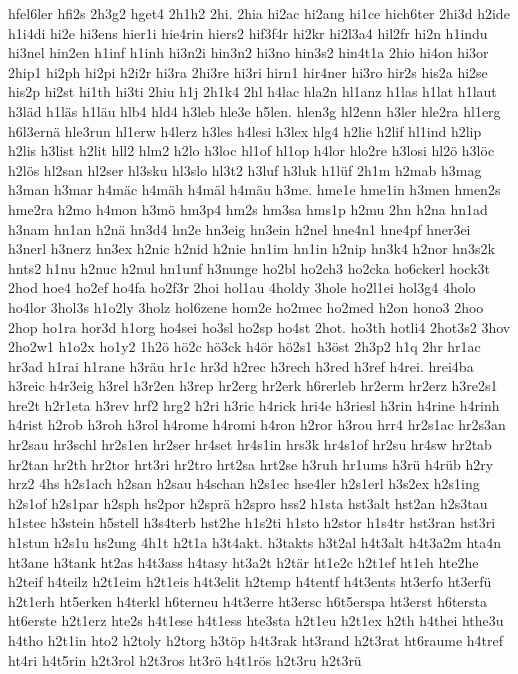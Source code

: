 {hfel6ler
hfi2s
2h3g2
hget4
2h1h2
2hi.
2hia
hi2ac
hi2ang
hi1ce
hich6ter
2hi3d
h2ide
h1i4di
hi2e
hi3ens
hier1i
hie4rin
hiers2
hif3f4r
hi2kr
hi2l3a4
hil2fr
hi2n
h1indu
hi3nel
hin2en
h1inf
h1inh
hi3n2i
hin3n2
hi3no
hin3s2
hin4t1a
2hio
hi4on
hi3or
2hip1
hi2ph
hi2pi
h2i2r
hi3ra
2hi3re
hi3ri
hirn1
hir4ner
hi3ro
hir2s
his2a
hi2se
his2p
hi2st
hi1th
hi3ti
2hiu
h1j
2h1k4
2hl
h4lac
hla2n
hl1anz
h1las
h1lat
h1laut
h3läd
h1läs
h1läu
hlb4
hld4
h3leb
hle3e
h5len.
hlen3g
hl2enn
h3ler
hle2ra
hl1erg
h6l3ernä
hle3run
hl1erw
h4lerz
h3les
h4lesi
h3lex
hlg4
h2lie
h2lif
hl1ind
h2lip
h2lis
h3list
h2lit
hll2
hlm2
h2lo
h3loc
hl1of
hl1op
h4lor
hlo2re
h3losi
hl2ö
h3löc
h2lös
hl2san
hl2ser
hl3sku
hl3slo
hl3t2
h3luf
h3luk
h1lüf
2h1m
h2mab
h3mag
h3man
h3mar
h4mäc
h4mäh
h4mäl
h4mäu
h3me.
hme1e
hme1in
h3men
hmen2s
hme2ra
h2mo
h4mon
h3mö
hm3p4
hm2s
hm3sa
hms1p
h2mu
2hn
h2na
hn1ad
h3nam
hn1an
h2nä
hn3d4
hn2e
hn3eig
hn3ein
h2nel
hne4n1
hne4pf
hner3ei
h3nerl
h3nerz
hn3ex
h2nic
h2nid
h2nie
hn1im
hn1in
h2nip
hn3k4
h2nor
hn3s2k
hnts2
h1nu
h2nuc
h2nul
hn1unf
h3nunge
ho2bl
ho2ch3
ho2cka
ho6ckerl
hock3t
2hod
hoe4
ho2ef
ho4fa
ho2f3r
2hoi
hol1au
4holdy
3hole
ho2l1ei
hol3g4
4holo
ho4lor
3hol3s
h1o2ly
3holz
hol6zene
hom2e
ho2mec
ho2med
h2on
hono3
2hoo
2hop
ho1ra
hor3d
h1org
ho4sei
ho3sl
ho2sp
ho4st
2hot.
ho3th
hotli4
2hot3s2
3hov
2ho2w1
h1o2x
ho1y2
1h2ö
hö2c
hö3ck
h4ör
hö2s1
h3öst
2h3p2
h1q
2hr
hr1ac
hr3ad
h1rai
h1rane
h3räu
hr1c
hr3d
h2rec
h3rech
h3red
h3ref
h4rei.
hrei4ba
h3reic
h4r3eig
h3rel
h3r2en
h3rep
hr2erg
hr2erk
h6rerleb
hr2erm
hr2erz
h3re2s1
hre2t
h2r1eta
h3rev
hrf2
hrg2
h2ri
h3ric
h4rick
hri4e
h3riesl
h3rin
h4rine
h4rinh
h4rist
h2rob
h3roh
h3rol
h4rome
h4romi
h4ron
h2ror
h3rou
hrr4
hr2s1ac
hr2s3an
hr2sau
hr3schl
hr2s1en
hr2ser
hr4set
hr4s1in
hrs3k
hr4s1of
hr2su
hr4sw
hr2tab
hr2tan
hr2th
hr2tor
hrt3ri
hr2tro
hrt2sa
hrt2se
h3ruh
hr1ums
h3rü
h4rüb
h2ry
hrz2
4hs
h2s1ach
h2san
h2sau
h4schan
h2s1ec
hse4ler
h2s1erl
h3s2ex
h2s1ing
h2s1of
h2s1par
h2sph
hs2por
h2sprä
h2spro
hss2
h1sta
hst3alt
hst2an
h2s3tau
h1stec
h3stein
h5stell
h3s4terb
hst2he
h1s2ti
h1sto
h2stor
h1s4tr
hst3ran
hst3ri
h1stun
h2s1u
hs2ung
4h1t
h2t1a
h3t4akt.
h3takts
h3t2al
h4t3alt
h4t3a2m
hta4n
ht3ane
h3tank
ht2as
h4t3ass
h4tasy
ht3a2t
h2tär
ht1e2c
h2t1ef
ht1eh
hte2he
h2teif
h4teilz
h2t1eim
h2t1eis
h4t3elit
h2temp
h4tentf
h4t3ents
ht3erfo
ht3erfü
h2t1erh
ht5erken
h4terkl
h6terneu
h4t3erre
ht3ersc
h6t5erspa
ht3erst
h6tersta
ht6erste
h2t1erz
hte2s
h4t1ese
h4t1ess
hte3sta
h2t1eu
h2t1ex
h2th
h4thei
hthe3u
h4tho
h2t1in
hto2
h2toly
h2torg
h3töp
h4t3rak
ht3rand
h2t3rat
ht6raume
h4tref
ht4ri
h4t5rin
h2t3rol
h2t3ros
ht3rö
h4t1rös
h2t3ru
h2t3rü
}
